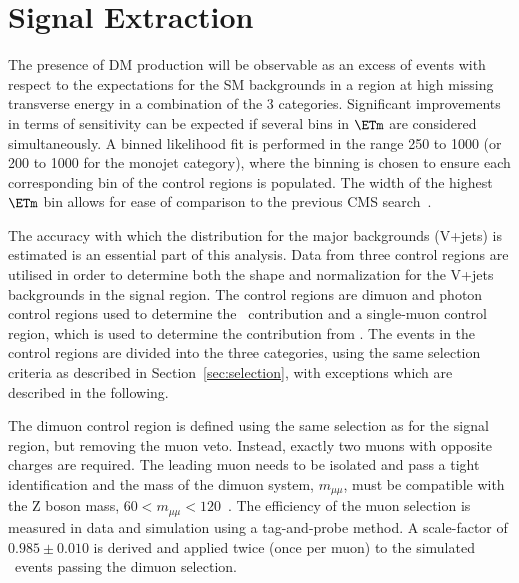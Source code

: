 \section{Signal Extraction}
The presence of DM production will be observable as an excess of events with respect to the expectations for the 
SM backgrounds in a region at high missing transverse energy in a combination of the 3 categories. Significant improvements in terms of sensitivity can be expected if 
several bins in $\ETm$ are considered simultaneously. 
A binned likelihood fit is performed in the range 250 \gev to 1000 \gev (or 200 \gev to 1000 \gev 
for the monojet category), where the binning is chosen to ensure each corresponding bin of the control regions  
is populated. The width of the highest $\ETm$ bin allows for ease of comparison to the previous CMS search~\cite{monojet1}. 

The accuracy with which the distribution for the major backgrounds (V+jets) is estimated is an essential part of this analysis. 
Data from three control regions are utilised in order to determine both the shape and normalization for the V+jets backgrounds in 
the signal region. The control regions are dimuon and photon control regions used to determine the \Zvvjets~contribution and a single-muon 
control region, which is used to determine the contribution from \Wlvjets. The events in the control regions are divided into the three 
categories, using the same selection criteria as described in Section~\ref{sec:selection}, with exceptions which are described in the following. 

The dimuon control region is defined using the same selection as for the signal region, 
but removing the muon veto. Instead, exactly two muons with opposite charges are 
required. The leading \pt muon needs to be isolated and pass a tight identification and 
the mass of the dimuon system, $m_{\mu\mu}$,  must be compatible with the Z boson mass, 
$60<m_{\mu\mu}<120$~\gev. The efficiency of the muon selection is measured 
in data and simulation using a tag-and-probe method. A scale-factor of $0.985\pm0.010$ is derived 
and applied twice (once per muon) to the simulated \Zjets~events passing the dimuon selection.

